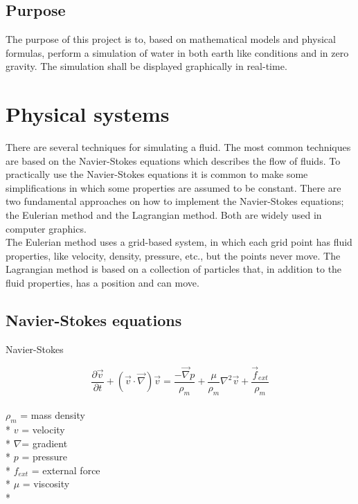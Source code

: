 \documentclass[a4paper,12pt,twoside]{report}
\begin{document}
\section{Purpose}
The purpose of this project is to, based on mathematical models and physical formulas, perform a simulation of water in both earth like conditions and in zero gravity. The simulation shall be displayed graphically in real-time.



\chapter{Physical systems}
There are several techniques for simulating a fluid. The most common techniques are based on the Navier-Stokes equations which describes the flow of fluids. To practically use the Navier-Stokes equations it is common to make some simplifications in which some properties are assumed to be constant. There are two fundamental approaches on how to implement the Navier-Stokes equations; the Eulerian method and the Lagrangian method. Both are widely used in computer graphics. \\

\noindent The Eulerian method uses a grid-based system, in which each grid point has fluid properties, like velocity, density, pressure, etc., but the points never move.
The Lagrangian method is based on a collection of particles that, in addition to the fluid properties, has a position and can move.

\section{Navier-Stokes equations}

Navier-Stokes

\begin{equation}
\frac{\partial \overrightarrow v}{\partial t} + ({\overrightarrow v}\cdot{\overrightarrow \nabla}){\overrightarrow v} = \frac{-\overrightarrow \nabla p}{\rho_m} + \frac{\mu}{\rho_m}{ \nabla^2}{\overrightarrow v} + \frac{\overrightarrow f_{ext}}{\rho_m}
\label{e1}
\end{equation} \\

\noindent$\rho_m$ = mass density\\*
$v$ = velocity\\*
$\nabla$= gradient\\*
$p$ = pressure\\*
$f_{ext}$ = external force\\*
$\mu$ = viscosity\\*
\end{document}

